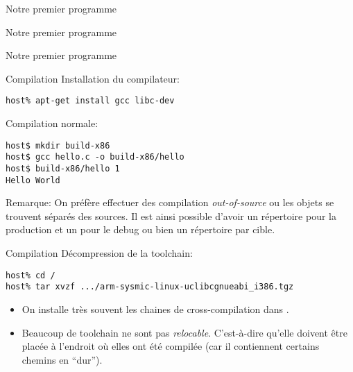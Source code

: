 \begin{frame}[fragile=singleslide]{Notre premier programme}{}
  
\end{frame}

\begin{frame}[fragile=singleslide]{Notre premier programme}{}
  
\end{frame}

\begin{frame}[fragile=singleslide]{Notre premier programme}{}
  
\end{frame}

\begin{frame}[fragile=singleslide]{Compilation}
  Installation du compilateur:
  \begin{lstlisting}
host% apt-get install gcc libc-dev
  \end{lstlisting}
  Compilation normale:
  \begin{lstlisting}
host$ mkdir build-x86
host$ gcc hello.c -o build-x86/hello
host$ build-x86/hello 1
Hello World
\end{lstlisting} %
Remarque: On préfère effectuer des compilation \emph{out-of-source} ou
les objets  se trouvent  séparés des sources.   Il est  ainsi possible
d'avoir un répertoire  pour la production et un pour  le debug ou bien
un répertoire par cible.
\end{frame}

\begin{frame}[fragile=singleslide]{Compilation}
  Décompression de la toolchain:
  \begin{lstlisting}
host% cd /
host% tar xvzf .../arm-sysmic-linux-uclibcgnueabi_i386.tgz
  \end{lstlisting}
  \begin{itemize}
  \item   On  installe  très souvent  les  chaines  de cross-compilation  dans
    .
  \item      Beaucoup      de      toolchain     ne      sont      pas
    \emph{relocable}.  C'est-à-dire  qu'elle  doivent  être  placée  à
    l'endroit où  elles ont été compilée (car  il contiennent certains
    chemins en ``dur'').
  \end{itemize}
\end{frame}


